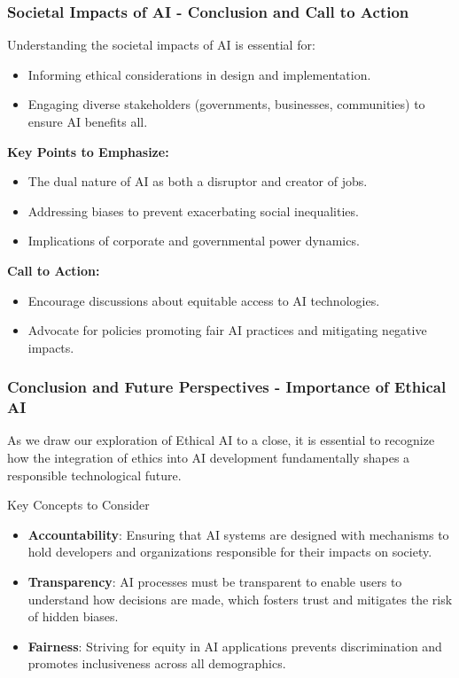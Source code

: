 \documentclass{beamer}
\begin{document}
\begin{frame}[fragile]
    \frametitle{Societal Impacts of AI - Conclusion and Call to Action}
    Understanding the societal impacts of AI is essential for:
    \begin{itemize}
        \item Informing ethical considerations in design and implementation.
        \item Engaging diverse stakeholders (governments, businesses, communities) to ensure AI benefits all.
    \end{itemize}

    \textbf{Key Points to Emphasize:}
    \begin{itemize}
        \item The dual nature of AI as both a disruptor and creator of jobs.
        \item Addressing biases to prevent exacerbating social inequalities.
        \item Implications of corporate and governmental power dynamics.
    \end{itemize}

    \textbf{Call to Action:}
    \begin{itemize}
        \item Encourage discussions about equitable access to AI technologies.
        \item Advocate for policies promoting fair AI practices and mitigating negative impacts.
    \end{itemize}
\end{frame}

\begin{frame}[fragile]
    \frametitle{Conclusion and Future Perspectives - Importance of Ethical AI}
    As we draw our exploration of Ethical AI to a close, it is essential to recognize how the integration of ethics into AI development fundamentally shapes a responsible technological future.
    
    \begin{block}{Key Concepts to Consider}
        \begin{itemize}
            \item \textbf{Accountability}: Ensuring that AI systems are designed with mechanisms to hold developers and organizations responsible for their impacts on society.
            \item \textbf{Transparency}: AI processes must be transparent to enable users to understand how decisions are made, which fosters trust and mitigates the risk of hidden biases.
            \item \textbf{Fairness}: Striving for equity in AI applications prevents discrimination and promotes inclusiveness across all demographics.
        \end{itemize}
    \end{block}
\end{frame}
\end{document}

